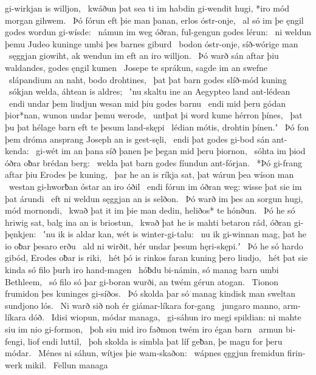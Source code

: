 gi-wirkjan is willjon, \hld\ kwáðun þat sea ti im habdin gi-wendit hugi,
*iro mód morgan gihwem. \hld\ Þó fórun eft þie man þanan,
erlos óstr-onje, \hld\ al só im þe ęngil godes
wordun gi-wísde: \hld\ námun im weg óðran,
ful-gengun godes lérun: \hld\ ni weldun þemu Judeo kuninge
umbi þes barnes giburd \hld\ bodon óstr-onje,
síð-wórige man \hld\ sęggjan giowiht,
ak wendun im eft an iro willjon. \hld\ Þó warð sán aftar þiu waldandes,
godes ęngil kumen \hld\ Josepe te sprákun,
sagde im an swefne \hld\ slápandium an naht,
bodo drohtines, \hld\ þat þat barn godes
slíð-mód kuning \hld\ sókjan welda,
áhtean is aldres; \hld\ ʽnu skaltu ine an Aegypteo
land ant-lédean \hld\ endi undar þem liudjun wesan
mid þiu godes barnu \hld\ endi mid þeru gódan þior*nan,
wunon undar þemu werode, \hld\ untþat þi word kume
hérron þínes, \hld\ þat þu þat hélage barn
eft te þesum land-skępi \hld\ lédian mótis,
drohtin þínen.ʼ \hld\ Þó fon þem dróma ansprang
Joseph an is gest-sęli, \hld\ endi þat godes gi-bod
sán ant-kenda: \hld\ gi-wét im an þana síð þanen
þe þegan mid þeru þiornon, \hld\ sóhta im þiod óðra
oƀar brédan berg: \hld\ welda þat barn godes
fíundun ant-fórjan. \hld\ *Þó gi-frang aftar þiu %
Erodes þe kuning, \hld\ þar he an is ríkja sat,
þat wárun þea wíson man \hld\ westan gi-hworƀan
óstar an iro óðil \hld\ endi fórun im óðran weg:
wisse þat sie im þat árundi \hld\ eft ni weldun
sęggjan an is selðon. \hld\ Þó warð im þes an sorgun hugi,
mód mornondi, \hld\ kwað þat it im þie man dedin,
heliðos* te hónðun. \hld\ Þó he só hriwig sat,
balg ina an is briostun, \hld\ kwað þat he is mahti betaron rád,
óðran gi-þęnkjen: \hld\ ʽnu ik is aldar kan,
wét is winter-gi-talu: \hld\ nu ik gi-winnan mag,
þat he io oƀar þesaro erðu \hld\ ald ni wirðit,
hér undar þesum hęri-skępi.ʼ \hld\ Þó he só hardo gibód,
Erodes oƀar is riki, \hld\ hét þó is rinkos faran
kuning þero liudjo, \hld\ hét þat sie kinda só filo
þurh iro hand-magen \hld\ hóƀdu bi-námin,
só manag barn umbi Bethleem, \hld\ só filo só þar gi-boran wurði,
an twém gérun atogan. \hld\ Tionon frumidon
þes kuninges gi-síðos. \hld\ Þó skolda þar só manag kindisk man
sweltan sundjono lós. \hld\ Ni warð sið noh ér
giámar-líkara for-gang \hld\ jungaro manno,
arm-líkara dóð. \hld\ Idisi wiopun,
módar managa, \hld\ gi-sáhun iro megi spildian:
ni mahte siu im nio gi-formon, \hld\ þoh siu mid iro faðmon twém
iro égan barn \hld\ armun bi-fengi,
liof endi luttil, \hld\ þoh skolda is simbla þat líf geƀan,
þe magu for þeru módar. \hld\ Ménes ni sáhun,
wítjes þie wam-skaðon: \hld\ wápnes ęggjun
fremidun firin-werk mikil. \hld\ Fellun managa
